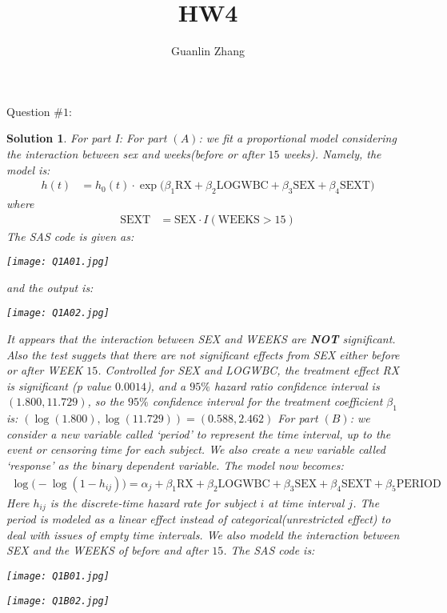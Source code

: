 \documentclass[11pt]{article}
\title{HW4}
\author{Guanlin Zhang}
\newtheorem{sol}{Solution}
\begin{document}
Question $\# 1$:
\begin{sol}
	For part I:\vskip 2mm
	For part $(A)$:\vskip 2mm
	we fit a proportional model considering the interaction between sex and weeks(before or after $15$ weeks). Namely, the model is:
	\begin{align*}
		h(t) &= h_0(t)\cdot \exp\Big(\beta_1\text{RX} + \beta_2\text{LOGWBC} + \beta_3\text{SEX} + \beta_4\text{SEXT}\Big)
	\end{align*}
	where 
	\begin{align*}
		\text{SEXT} &= \text{SEX}\cdot I(\text{WEEKS} > 15)
	\end{align*}
	The SAS code is given as:
	\begin{center}
		\texttt{[image: Q1A01.jpg]}
	\end{center}
	and the output is:
	\begin{center}
		\texttt{[image: Q1A02.jpg]}
	\end{center}
	It appears that the interaction between SEX and WEEKS are {\bf NOT} significant. Also the test suggets that there are not significant effects from SEX either before or after WEEK $15$.\vskip 2mm
	Controlled for SEX and LOGWBC, the treatment effect RX is significant (p value $0.0014$), and a $95\%$ hazard ratio confidence interval is $(1.800, 11.729)$, so the $95\%$ confidence interval for the treatment coefficient $\beta_1$ is: $(\log(1.800), \log(11.729)) = (0.588, 2.462)$\vskip 2mm
	For part $(B)$:\vskip 2mm
	we consider a new variable called `period' to represent the time interval, up to the event or censoring time for each subject.\vskip 2mm
	We also create a new variable called `response' as the binary dependent variable.\vskip 2mm
	The model now becomes:
	\begin{align*}
		\log\Big(-\log(1 - h_{ij})\Big) = \alpha_j + \beta_1\text{RX} + \beta_2\text{LOGWBC} + \beta_3\text{SEX} + \beta_4\text{SEXT} + \beta_5\text{PERIOD}
	\end{align*}
	Here $h_{ij}$ is the discrete-time hazard rate for subject $i$ at time interval $j$.\vskip 2mm
	The period is modeled as a linear effect instead of categorical(unrestricted effect) to deal with issues of empty time intervals. We also modeld the interaction between SEX and the WEEKS of before and after $15$.\vskip 2mm
	The SAS code is:
	\begin{center}
		\texttt{[image: Q1B01.jpg]}
	\end{center}
	\begin{center}
		\texttt{[image: Q1B02.jpg]}

\end{center}
\end{sol}
\end{document}
